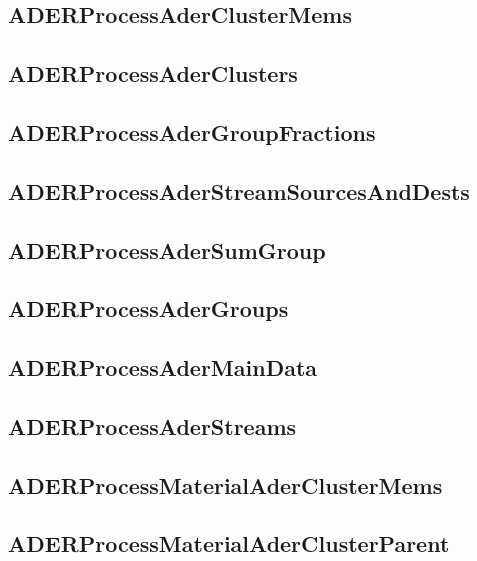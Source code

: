 \subsection{ADERProcessAderClusterMems}


\subsection{ADERProcessAderClusters}


\subsection{ADERProcessAderGroupFractions}


\subsection{ADERProcessAderStreamSourcesAndDests}


\subsection{ADERProcessAderSumGroup}


\subsection{ADERProcessAderGroups}


\subsection{ADERProcessAderMainData}


\subsection{ADERProcessAderStreams}


\subsection{ADERProcessMaterialAderClusterMems}


\subsection{ADERProcessMaterialAderClusterParent}


